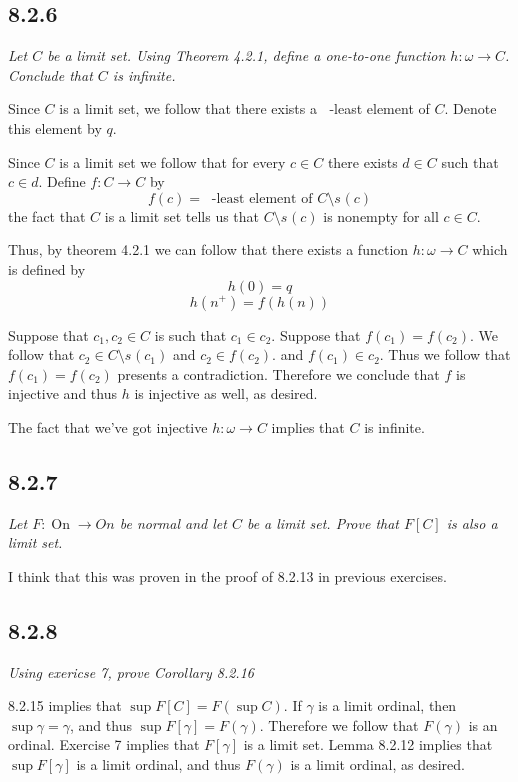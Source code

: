 \documentclass[11pt,oneside,titlepage]{book}
\DeclareMathOperator \On {On}
\DeclareMathOperator \ineq {\underline{\in}}
\begin{document}
\subsection*{8.2.6}

\textit{Let $C$ be a limit set. Using Theorem 4.2.1, define a one-to-one function
  $h: \omega \to C$. Conclude that $C$ is infinite.}

Since $C$ is a limit set, we follow that there exists a $\ineq$-least element of $C$.
Denote this element by $q$.

Since $C$ is a limit set we follow that for every $c \in C$ there exists $d \in C$
such that $c \in d$. Define $f: C \to C$ by
$$f(c) = \ineq\text{-least element of } C \setminus s^{\ineq}(c)$$
the fact that $C$ is a limit set tells us that $C \setminus s^{\ineq}(c)$ is
nonempty for all $c \in C$.

Thus, by theorem 4.2.1 we can follow that there exists a function $h: \omega \to C$
which is defined by
$$h(0) = q$$
$$h(n^+) = f(h(n))$$

Suppose that $c_1, c_2 \in C$ is such that $c_1 \in c_2$. Suppose that
$f(c_1) = f(c_2)$. We follow that $c_2 \in C \setminus s^{\ineq}(c_1)$ and $c_2 \in f(c_2)$.
and $f(c_1) \in c_2$. Thus we follow that $f(c_1) = f(c_2)$ presents a contradiction.
Therefore we conclude that $f$ is injective and thus $h$ is injective as well, as desired.

The fact that we've got injective $h: \omega \to C$ implies that $C$ is infinite.

\subsection*{8.2.7}

\textit{Let $F: \On \to On$ be normal and let $C$ be a limit set. Prove that $F[C]$
  is also a limit set.}

I think that this was proven in the proof of 8.2.13 in previous exercises.

\subsection*{8.2.8}

\textit{Using exericse 7, prove Corollary 8.2.16}

8.2.15 implies that $\sup F[C] = F(\sup C)$. If $\gamma$ is a limit ordinal, then
$\sup \gamma = \gamma$, and thus $\sup F[\gamma] = F(\gamma)$. Therefore
we follow that $F(\gamma)$ is an ordinal. Exercise 7 implies that $F[\gamma]$ is
a limit set. Lemma 8.2.12 implies that $\sup F[\gamma]$ is a limit ordinal, and thus
$F(\gamma)$ is a limit ordinal, as desired.
\end{document}
